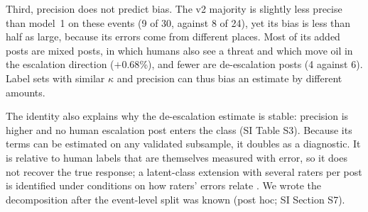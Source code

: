 \documentclass[12pt]{article}
\begin{document}
Third, precision does not predict bias. The v2 majority is slightly less precise than model~1 on these events (9 of 30, against 8 of 24), yet its bias is less than half as large, because its errors come from different places. Most of its added posts are mixed posts, in which humans also see a threat and which move oil in the escalation direction ($+0.68$\%), and fewer are de-escalation posts (4 against 6). Label sets with similar $\kappa$ and precision can thus bias an estimate by different amounts.

The identity also explains why the de-escalation estimate is stable: precision is higher and no human escalation post enters the class (SI Table S3). Because its terms can be estimated on any validated subsample, it doubles as a diagnostic. It is relative to human labels that are themselves measured with error, so it does not recover the true response; a latent-class extension with several raters per post is identified under conditions on how raters' errors relate \citep{hu2008}. We wrote the decomposition after the event-level split was known (post hoc; SI Section S7).
\end{document}

